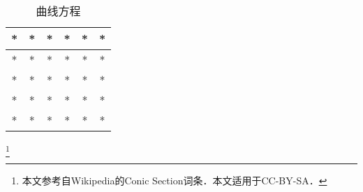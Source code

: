 
\begin{issues}
\issueDraft
\end{issues}
\begin{table}[ht]
\centering
\caption{曲线方程}\label{conic_tab1}
\begin{tabular}{|c|c|c|c|c|c|}
\hline
* & * & * & * & * & * \\
\hline
* & * & * & * & * & * \\
\hline
* & * & * & * & * & * \\
\hline
* & * & * & * & * & * \\
\hline
* & * & * & * & * & * \\
\hline
\end{tabular}
\end{table}
\footnote{本文参考自Wikipedia的Conic Section词条．本文适用于CC-BY-SA．}
